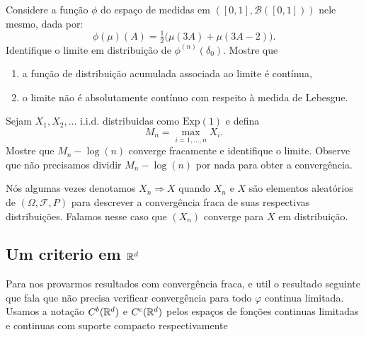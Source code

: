 \begin{exercise}
  Considere a função $\phi$ do espaço de medidas em $([0,1], \mathcal{B}([0,1]))$ nele mesmo, dada por:
  \begin{equation}
    \phi(\mu)(A) = \tfrac{1}{2} \big( \mu(3A) + \mu(3A - 2) \big).
  \end{equation}
  Identifique o limite em distribuição de $\phi^{(n)}(\delta_0)$.
  Mostre que
  \begin{enumerate}[\quad a)]
  \item a função de distribuição acumulada associada ao limite é contínua,
  \item o limite não é absolutamente contínuo com respeito à medida de Lebesgue.
  \end{enumerate}
\end{exercise}

\begin{exercise}
  Sejam $X_1, X_2, \dots$ i.i.d. distribuidas como $\text{Exp}(1)$ e defina
  \begin{equation}
    M_n = \max_{i = 1, \dots, n} X_i.
  \end{equation}
  Mostre que $M_n - \log(n)$ converge fracamente e identifique o limite.
  Observe que não precisamos dividir $M_n - \log(n)$ por nada para obter a convergência.
\end{exercise}

Nós algumas vezes denotamos $X_n \Rightarrow X$ quando $X_n$ e $X$ são elementos aleatórios de $(\Omega, \mathcal{F}, P)$ 
para descrever a convergência fraca de suas respectivas distribuições. Falamos nesse caso que $(X_n)$ converge para $X$ em distribuição.

\subsection{Um criterio em ${\mathbb R}^d$}



Para nos provarmos resultados com convergência fraca, 
e util o resultado seguinte que fala que não precisa verificar convergência para todo $\varphi$ continua limitada. 
Usamos a notação $C^b({\mathbb R}^d)$ e $C^c({\mathbb R}^d)$ pelos espaços de fonções continuas limitadas e continuas com suporte compacto respectivamente

